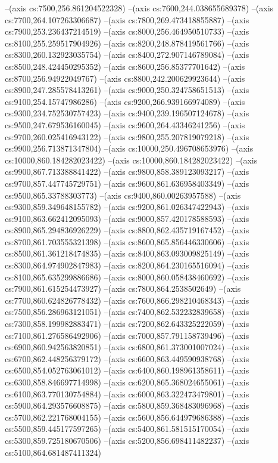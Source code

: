 --(axis cs:7500,256.861204522328)
--(axis cs:7600,244.038655689378)
--(axis cs:7700,264.107263306687)
--(axis cs:7800,269.473418855887)
--(axis cs:7900,253.236437214519)
--(axis cs:8000,256.464950510733)
--(axis cs:8100,255.259517904926)
--(axis cs:8200,248.878419561766)
--(axis cs:8300,260.132923035754)
--(axis cs:8400,272.907146789084)
--(axis cs:8500,248.424450295352)
--(axis cs:8600,256.85377701642)
--(axis cs:8700,256.94922049767)
--(axis cs:8800,242.200629923644)
--(axis cs:8900,247.285578413261)
--(axis cs:9000,250.324758651513)
--(axis cs:9100,254.15747986286)
--(axis cs:9200,266.939166974089)
--(axis cs:9300,234.752530757423)
--(axis cs:9400,239.196507124678)
--(axis cs:9500,247.679536160045)
--(axis cs:9600,264.43346241256)
--(axis cs:9700,260.025416943122)
--(axis cs:9800,255.207819079218)
--(axis cs:9900,256.713871347804)
--(axis cs:10000,250.496708653976)
--(axis cs:10000,860.184282023422)
--(axis cs:10000,860.184282023422)
--(axis cs:9900,867.713388841422)
--(axis cs:9800,858.389123093217)
--(axis cs:9700,857.447745729751)
--(axis cs:9600,861.636958403349)
--(axis cs:9500,865.33788303773)
--(axis cs:9400,860.00263957588)
--(axis cs:9300,859.349648155782)
--(axis cs:9200,861.026347422943)
--(axis cs:9100,863.662412095093)
--(axis cs:9000,857.420178588593)
--(axis cs:8900,865.294836926229)
--(axis cs:8800,862.435719167452)
--(axis cs:8700,861.703555321398)
--(axis cs:8600,865.856446330606)
--(axis cs:8500,861.361218474835)
--(axis cs:8400,863.093009825149)
--(axis cs:8300,864.974902847983)
--(axis cs:8200,864.230165516094)
--(axis cs:8100,865.635299886686)
--(axis cs:8000,860.058438460692)
--(axis cs:7900,861.615254473927)
--(axis cs:7800,864.2538502649)
--(axis cs:7700,860.624826778432)
--(axis cs:7600,866.298210468343)
--(axis cs:7500,856.286963121051)
--(axis cs:7400,862.532232839658)
--(axis cs:7300,858.199982883471)
--(axis cs:7200,862.643325222059)
--(axis cs:7100,861.276586492906)
--(axis cs:7000,857.791158739496)
--(axis cs:6900,860.942563820851)
--(axis cs:6800,861.373001007024)
--(axis cs:6700,862.448256379172)
--(axis cs:6600,863.449590938768)
--(axis cs:6500,854.052763061012)
--(axis cs:6400,860.198961358611)
--(axis cs:6300,858.846697714998)
--(axis cs:6200,865.368024655061)
--(axis cs:6100,863.770130754884)
--(axis cs:6000,863.322473479801)
--(axis cs:5900,864.293576608875)
--(axis cs:5800,859.368483096968)
--(axis cs:5700,862.221768004155)
--(axis cs:5600,856.644979686388)
--(axis cs:5500,859.445177597265)
--(axis cs:5400,861.581515170054)
--(axis cs:5300,859.725180670506)
--(axis cs:5200,856.698411482237)
--(axis cs:5100,864.681487411324)
